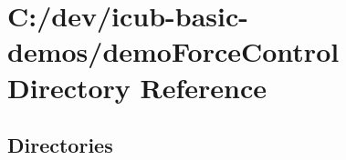 \section{C\+:/dev/icub-\/basic-\/demos/demo\+Force\+Control Directory Reference}
\label{dir_811e15f64083e64bb2a9d8e860a70892}
\subsection*{Directories}
\begin{DoxyCompactItemize}
\end{DoxyCompactItemize}
